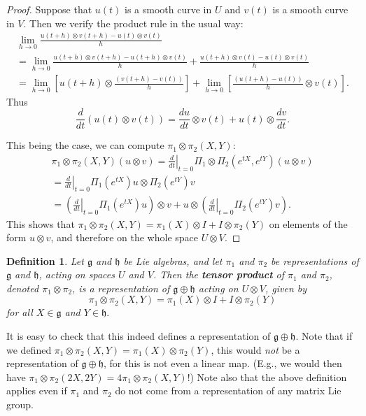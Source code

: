 \documentclass[12pt]{amsbook}
\let \frak = \mathfrak
\theoremstyle{plain}
\newtheorem{definition}[theorem]{Definition}
\numberwithin{equation}{chapter}
\numberwithin{theorem}{chapter}
\begin{document}
\begin{proof}
Suppose that $u(t)$ is a smooth curve in $U$ and $v(t)$ is a smooth curve in
$V$. Then we verify the product rule in the usual way:
\begin{align*}
\lim_{h\rightarrow0}\frac{u(t+h)\otimes v(t+h)-u(t)\otimes v(t)}{h}\\
=\lim_{h\rightarrow0}\frac{u(t+h)\otimes v(t+h)-u(t+h)\otimes v(t)}{h}%
+\frac{u(t+h)\otimes v(t)-u(t)\otimes v(t)}{h}\\
=\lim_{h\rightarrow0}\left[  u(t+h)\otimes\frac{\left(  v(t+h)-v\left(
t\right)  \right)  }{h}\right]  +\lim_{h\rightarrow0}\left[  \frac{\left(
u(t+h)-u\left(  t\right)  \right)  }{h}\otimes v(t)\right]  \text{.}%
\end{align*}
Thus
\[
\frac{d}{dt}\left(  u(t)\otimes v(t)\right)  =\frac{du}{dt}\otimes
v(t)+u(t)\otimes\frac{dv}{dt}\text{.}%
\]

This being the case, we can compute $\pi_{1}\otimes\pi_{2}(X,Y)$:
\begin{align*}
\pi_{1}\otimes\pi_{2}(X,Y)(u\otimes v)=\left.  \frac{d}{dt}\right|  _{t=0}%
\Pi_{1}\otimes\Pi_{2}(e^{tX},e^{tY})(u\otimes v)\\
=\left.  \frac{d}{dt}\right|  _{t=0}\Pi_{1}(e^{tX})u\otimes\Pi_{2}(e^{tY})v\\
=\left(  \left.  \frac{d}{dt}\right|  _{t=0}\Pi_{1}(e^{tX})u\right)  \otimes
v+u\otimes\left(  \left.  \frac{d}{dt}\right|  _{t=0}\Pi_{2}(e^{tY})v\right)
\text{.}%
\end{align*}
This shows that $\pi_{1}\otimes\pi_{2}(X,Y)=\pi_{1}(X)\otimes I+I\otimes
\pi_{2}(Y)$ on elements of the form $u\otimes v$, and therefore on the whole
space $U\otimes V$.
\end{proof}

\begin{definition}
\label{tensor.algebra.2}Let $\frak{g}$ and $\frak{h}$ be Lie algebras, and let
$\pi_{1}$ and $\pi_{2}$ be representations of $\frak{g}$ and $\frak{h}$,
acting on spaces $U$ and $V$. Then the \textbf{tensor product} of $\pi_{1}$
and $\pi_{2}$, denoted $\pi_{1}\otimes\pi_{2}$, is a representation of
$\frak{g}\oplus\frak{h}$ acting on $U\otimes V$, given by
\[
\pi_{1}\otimes\pi_{2}(X,Y)=\pi_{1}(X)\otimes I+I\otimes\pi_{2}(Y)
\]
for all $X\in\frak{g}$ and $Y\in\frak{h}.$
\end{definition}

It is easy to check that this indeed defines a representation of
$\frak{g}\oplus\frak{h}$. Note that if we defined $\pi_{1}\otimes\pi
_{2}(X,Y)=\pi_{1}(X)\otimes\pi_{2}(Y)$, this would \textit{not} be a
representation of $\frak{g}\oplus\frak{h}$, for this is not even a linear map.
(E.g., we would then have $\pi_{1}\otimes\pi_{2}(2X,2Y)=4\pi_{1}\otimes\pi
_{2}(X,Y)$!) Note also that the above definition applies even if $\pi_{1}$ and
$\pi_{2}$ do not come from a representation of any matrix Lie group.
\end{document}
